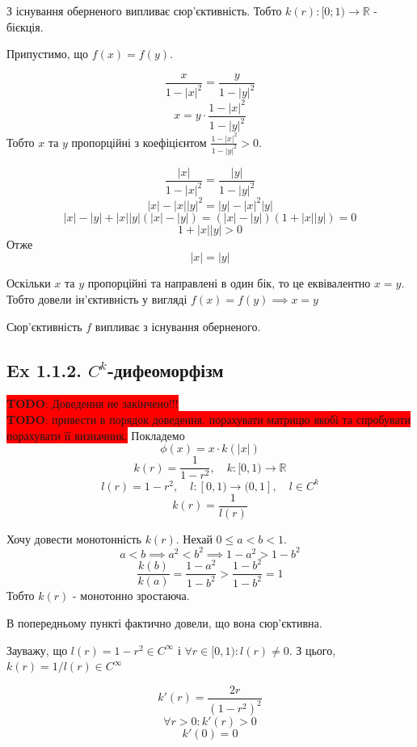 \documentclass[10pt, a4paper]{article} %
\newcommand{\R}{\mathbb{R}}
\newcommand{\todo}[1]{\colorbox{red}{\textbf{TODO}: #1}}
\begin{document}
З існування оберненого випливає сюр'єктивність.
Тобто $k(r) : [0;1) \to \R$ - бієкція.

Припустимо, що $f(x)=f(y)$.

\[\frac{x}{1-|x|^2} = \frac{y}{1-|y|^2}\]
\[x = y \cdot \frac{1-|x|^2}{1-|y|^2}\]
Тобто $x$ та $y$ пропорційні з коефіцієнтом $\frac{1-|x|^2}{1-|y|^2} > 0$.

\[\frac{|x|}{1-|x|^2} = \frac{|y|}{1-|y|^2}\]
\[|x|-|x||y|^2 = |y|-|x|^2|y|\]
\[|x|-|y|+|x||y|(|x|-|y|) = (|x|-|y|)(1+|x||y|) = 0\]
\[1 + |x||y| > 0\]
Отже
\[|x|=|y|\]

Оскільки $x$ та $y$ пропорційні та направлені в один бік, то це еквівалентно $x=y$.
Тобто довели ін'єктивність у вигляді $f(x)=f(y) \implies x=y$

Сюр'єктивність $f$ випливає з існування оберненого.

\subsection*{Ex 1.1.2. $C^k$-дифеоморфізм}
\todo{Доведення не закінчено!!!}\\
\todo{привести в порядок доведення. порахувати матрицю якобі та спробувати порахувати її визначник.}
Покладемо
\[\phi(x) = x \cdot k(|x|)\]
\[k(r) = \frac{1}{1-r^2}, \quad k : [0,1) \to \R\] 
\[l(r) = 1-r^2, \quad l : [0,1) \to (0,1], \quad l\in C^k\]
\[k(r) = \frac{1}{l(r)}\]



Хочу довести монотонність $k(r)$. Нехай $0\le a<b < 1$.
\[a<b \implies a^2 < b^2 \implies 1-a^2 > 1-b^2\]
\[\frac{k(b)}{k(a)} = \frac{1-a^2}{1-b^2} > \frac{1-b^2}{1-b^2} = 1 \]
Тобто $k(r)$ - монотонно зростаюча.

В попередньому пункті фактично довели, що вона сюр'єктивна.

Зауважу, що $l(r)=1-r^2 \in C^\infty$ і $\forall r \in [0,1): l(r) \ne 0$.
З цього, $k(r) = 1/l(r) \in C^\infty$

\[k'(r) = \frac{2r}{(1-r^2)^2}\]
\[\forall r>0: k'(r) > 0\]
\[k'(0) = 0\]
\end{document}
